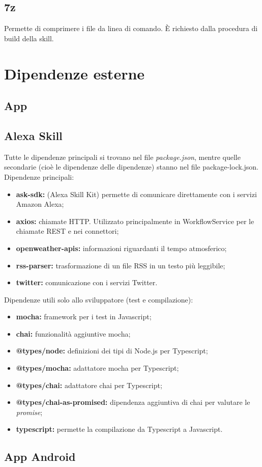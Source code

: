 \subsection{7z}
Permette di comprimere i file da linea di comando. \`{E} richiesto dalla procedura di build della skill.



\section{Dipendenze esterne}
\subsection{App}


\subsection{Alexa Skill}\label{ATecnologie}
Tutte le dipendenze principali si trovano nel file \textit{package.json}, mentre quelle secondarie (cioè le dipendenze delle dipendenze) stanno nel file package-lock.json.\\
Dipendenze principali:
\begin{itemize}
    \item \textbf{ask-sdk:} (Alexa Skill Kit) permette di comunicare direttamente con i servizi Amazon Alexa;
    \item \textbf{axios:} chiamate HTTP. Utilizzato principalmente in WorkflowService per le chiamate REST e nei connettori;
    \item \textbf{openweather-apis:} informazioni riguardanti il tempo atmosferico;
    \item \textbf{rss-parser:} trasformazione di un file RSS in un testo più leggibile;
    \item \textbf{twitter:} comunicazione con i servizi Twitter.
\end{itemize}
Dipendenze utili solo allo sviluppatore (test e compilazione):
\begin{itemize}
    \item \textbf{mocha:} framework per i test in Javascript;
    \item \textbf{chai:} funzionalità aggiuntive mocha;
    \item \textbf{@types/node:} definizioni dei tipi di Node.js per Typescript;
    \item \textbf{@types/mocha:} adattatore mocha per Typescript; 
    \item \textbf{@types/chai:} adattatore chai per Typescript;
    \item \textbf{@types/chai-as-promised:} dipendenza aggiuntiva di chai per valutare le \textit{promise};
    \item \textbf{typescript:} permette la compilazione da Typescript a Javascript.
\end{itemize}

\subsection{App Android}